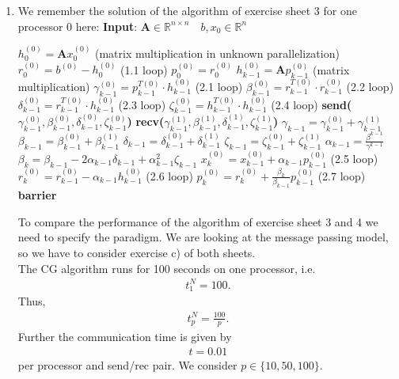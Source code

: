 \documentclass{article}
\begin{document}
\begin{enumerate}[label=(\alph*)]
\item  We remember the solution of the algorithm of exercise sheet 3 for one processor 0 here:
 \textbf{Input}: $ \textbf{A} \in \mathbb{R}^{n\times n} \quad b, x_0\in \mathbb{R}^n$ 
    \begin{algorithmic}[1]
	\State $h^{(0)}_{0} = \textbf{A}x_{0}^{(0)}$ (matrix multiplication in unknown parallelization)
	\State $r_0^{(0)} = b^{(0)} - h_0^{(0)}$ (1.1 loop)
	\State $p_0^{(0)} = r_0^{(0)}$
	\State $h_{k-1}^{(0)} = \textbf{A}p_{k-1}^{(0)}$ (matrix multiplication)
	\State $\gamma_{k-1}^{(0)} = p^{T(0)}_{k-1}\cdot h_{k-1}^{(0)}$ (2.1 loop)
	\State $\beta_{k-1}^{(0)} = r^{T(0)}_{k-1}\cdot r_{k-1}^{(0)}$ (2.2 loop)
	\State $\delta_{k-1}^{(0)} = r^{T(0)}_{k-1}\cdot h_{k-1}^{(0)}$ (2.3 loop)
	\State $\zeta_{k-1}^{(0)} = h^{T(0)}_{k-1}\cdot h_{k-1}^{(0)}$ (2.4 loop)
      	\State \textbf{send($\gamma_{k-1}^{(0)}, \beta_{k-1}^{(0)}, \delta_{k-1}^{(0)}, \zeta_{k-1}^{(0)}$)}
      	\State \textbf{recv($\gamma_{k-1}^{(1)}, \beta_{k-1}^{(1)}, \delta_{k-1}^{(1)}, \zeta_{k-1}^{(1)}$)}
      	\State $\gamma_{k-1}=\gamma_{k-1}^{(0)} + \gamma_{k-1}^{(1)}$
      	\State $\beta_{k-1}=\beta_{k-1}^{(0)} + \beta_{k-1}^{(1)}$
      	\State $\delta_{k-1}=\delta_{k-1}^{(0)} + \delta_{k-1}^{(1)}$
      	\State $\zeta_{k-1}=\zeta_{k-1}^{(0)} + \zeta_{k-1}^{(1)}$
	\State $\alpha_{k-1} = \frac{\beta^{k-1}}{\gamma^{k-1}}$
	\State $\beta_{k} = \beta_{k-1} - 2 \alpha_{k-1} \delta_{k-1} + \alpha_{k-1}^2\zeta_{k-1}$
	\State $x_k^{(0)} = x_{k-1}^{(0)} + \alpha_{k-1}p_{k-1}^{(0)}$ (2.5 loop)
	\State $r_k^{(0)} = r_{k-1}^{(0)} - \alpha_{k-1}h_{k-1}^{(0)}$ (2.6 loop)
	\State $p_k^{(0)} = r_{k}^{(0)} + \frac{\beta_k}{\beta_{k-1}}p_{k-1}^{(0)}$ (2.7 loop)
	\State \textbf{barrier}
	\EndFor
    \end{algorithmic} 
To compare the performance of the algorithm of exercise sheet 3 and 4 we need to specify the paradigm. We are looking at the message passing model, so we have to consider exercise c) of both sheets.
\\
The CG algorithm runs for 100 seconds on one processor, i.e. 
\begin{align*}
    t_1^N=100.
\end{align*}
Thus,
\begin{align*}
    t_p^N=\frac{100}{p}.
\end{align*}
Further the communication time is given by
\begin{align*}
    t=0.01
\end{align*}
per processor and send/rec pair. We consider $p\in\{10,50,100\}$.

\end{enumerate}
\end{document}
